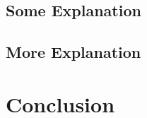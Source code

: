 \documentclass[10pt,twoside]{article}
\begin{document}
\subsection{Some Explanation}\label{explanation}

\subsection{More Explanation}\label{more-explanation}

\section{Conclusion}\label{conclusion}

\newpage


\cite{wikiscraping}
\cite{dive-into-web-scraping}
\cite{simplilearn-data-collection}
\cite{towardsdatascience-web-scraping}
\end{document}
